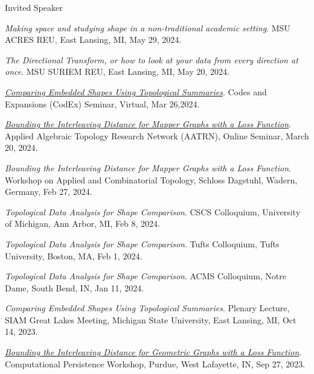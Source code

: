 \documentclass{resume} %
\begin{document}
%
\newpage
\begin{rSection}{Invited Speaker}

\begin{etaremune}
\item\emph{Making space and studying shape in a non-traditional academic setting}. MSU ACRES REU, East Lansing, MI, May 29, 2024. 

\item\emph{The Directional Transform, or how to look at your data from every direction at once}. MSU SURIEM REU, East Lansing, MI, May 20, 2024. 

\item\emph{\href{https://youtu.be/YU37CoqA7Ao}{Comparing Embedded Shapes Using Topological Summaries}}. Codes and Expansions (CodEx) Seminar, Virtual, Mar 26,2024. 

\item\emph{\href{https://youtu.be/PHu6u8XXyh8}{Bounding the Interleaving Distance for Mapper Graphs with a Loss Function}}. Applied Algebraic Topology Research Network (AATRN), Online Seminar, March 20, 2024. 

\item\emph{Bounding the Interleaving Distance for Mapper Graphs with a Loss Function}. Workshop on Applied and Combinatorial Topology, Schloss Dagstuhl, Wadern, Germany, Feb 27, 2024. 

\item\emph{Topological Data Analysis for Shape Comparison}. CSCS Colloquium, University of Michigan, Ann Arbor, MI, Feb 8, 2024. 

\item\emph{Topological Data Analysis for Shape Comparison}. Tufts Colloquium, Tufts University, Boston, MA, Feb 1, 2024. 

\item\emph{Topological Data Analysis for Shape Comparison}. ACMS Colloquium, Notre Dame, South Bend, IN, Jan 11, 2024. 

\item\emph{Comparing Embedded Shapes Using Topological Summaries}. Plenary Lecture, SIAM Great Lakes Meeting, Michigan State University, East Lansing, MI, Oct 14, 2023. 

\item\emph{\href{https://youtu.be/PJBgBoowQA4}{Bounding the Interleaving Distance for Geometric Graphs with a Loss Function}}. Computational Persistence Workshop, Purdue, West Lafayette, IN, Sep 27, 2023. 


\end{etaremune}
\end{rSection}
\end{document}
